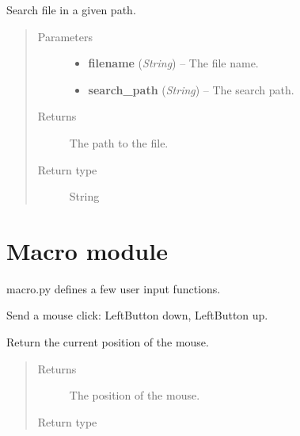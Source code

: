 \documentclass[letterpaper,10pt,english]{sphinxmanual}
\begin{document}

\begin{fulllineitems}
\label{filesystem:filesystem.SearchFile}
Search file in a given path.
\begin{quote}\begin{description}
\item[{Parameters}] \leavevmode\begin{itemize}
\item {} 
\textbf{filename} (\emph{String}) -- The file name.

\item {} 
\textbf{search\_path} (\emph{String}) -- The search path.

\end{itemize}

\item[{Returns}] \leavevmode
The path to the file.

\item[{Return type}] \leavevmode
String

\end{description}\end{quote}

\end{fulllineitems}



\section{Macro module}
\label{macro:macro-module}\label{macro:module-macro}\label{macro::doc}
macro.py defines a few user input functions.

\begin{fulllineitems}
\label{macro:macro.Click}
Send a mouse click: LeftButton down, LeftButton up.

\end{fulllineitems}


\begin{fulllineitems}
\label{macro:macro.GetPos}
Return the current position of the mouse.
\begin{quote}\begin{description}
\item[{Returns}] \leavevmode
The position of the mouse.

\item[{Return type}] \leavevmode
{\hyperref[macro:macro.POINT]{}}

\end{description}\end{quote}

\end{fulllineitems}
\end{document}
